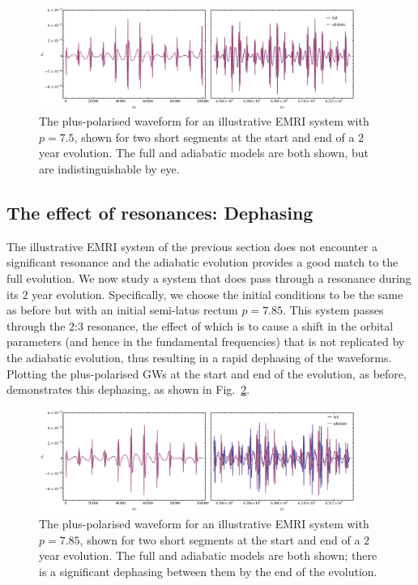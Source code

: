 \documentclass[aps,prd,amsfonts,amssymb,amsmath,nofootinbib,reprint,showpacs]{revtex4}
\newcommand{\figref}[1]{Fig.\ \ref{fig:#1}}
\begin{document}
\begin{figure}[htbp]
\centering
\includegraphics[width=0.92\textwidth]{Fig_good_waveform}
\caption{\label{fig:good-waveform}The plus-polarised waveform for an illustrative EMRI system with $p=7.5$, shown for two short segments at the start and end of a $2$ year evolution. The full and adiabatic models are both shown, but are indistinguishable by eye.}
\end{figure}

\subsection{The effect of resonances: Dephasing}

The illustrative EMRI system of the previous section does not encounter a significant resonance and the adiabatic evolution provides a good match to the full evolution. We now study a system that does pass through a resonance during its $2$ year evolution. Specifically, we choose the initial conditions to be the same as before but with an initial semi-latus rectum $p=7.85$. This system passes through the 2:3 resonance, the effect of which is to cause a shift in the orbital parameters (and hence in the fundamental frequencies) that is not replicated by the adiabatic evolution, thus resulting in a rapid dephasing of the waveforms. Plotting the plus-polarised GWs at the start and end of the evolution, as before, demonstrates this dephasing, as shown in \figref{dephased-waveform}.

\begin{figure}[htbp]
\centering
\includegraphics[width=0.92\textwidth]{Fig_dephased_waveform}
\caption{\label{fig:dephased-waveform}The plus-polarised waveform for an illustrative EMRI system with $p=7.85$, shown for two short segments at the start and end of a $2$ year evolution. The full and adiabatic models are both shown; there is a significant dephasing between them by the end of the evolution.}
\end{figure}
\end{document}
